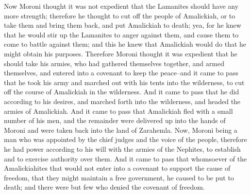 Now Moroni thought it was not expedient that the Lamanites should have any more strength; therefore he thought to cut off the people of Amalickiah, or to take them and bring them back, and put Amalickiah to death; yea, for he knew that he would stir up the Lamanites to anger against them, and cause them to come to battle against them; and this he knew that Amalickiah would do that he might obtain his purposes.
\bverse \iffalse Therefore Moroni thought it was expedient that he should take his armies, who had gathered themselves together, and armed themselves, and entered into a covenant to keep the peace--and it came to pass that he took his army and marched out with his tents into the wilderness, to cut off the course of Amalickiah in the wilderness. \fi
Therefore Moroni thought it was expedient that he should take his armies, who had gathered themselves together, and armed themselves, and entered into a covenant to keep the peace--and it came to pass that he took his army and marched out with his tents into the wilderness, to cut off the course of Amalickiah in the wilderness.
\bverse \iffalse And it came to pass that he did according to his desires, and marched forth into the wilderness, and headed the armies of Amalickiah. \fi
And it came to pass that he did according to his desires, and marched forth into the wilderness, and headed the armies of Amalickiah.
\bverse \iffalse And it came to pass that Amalickiah fled with a small number of his men, and the remainder were delivered up into the hands of Moroni and were taken back into the land of Zarahemla. \fi
And it came to pass that Amalickiah fled with a small number of his men, and the remainder were delivered up into the hands of Moroni and were taken back into the land of Zarahemla.
\bverse \iffalse Now, Moroni being a man who was appointed by the chief judges and the voice of the people, therefore he had power according to his will with the armies of the Nephites, to establish and to exercise authority over them. \fi
Now, Moroni being a man who was appointed by the chief judges and the voice of the people, therefore he had power according to his will with the armies of the Nephites, to establish and to exercise authority over them.
\bverse \iffalse And it came to pass that whomsoever of the Amalickiahites that would not enter into a covenant to support the cause of freedom, that they might maintain a free government, he caused to be put to death; and there were but few who denied the covenant of freedom. \fi
And it came to pass that whomsoever of the Amalickiahites that would not enter into a covenant to support the cause of freedom, that they might maintain a free government, he caused to be put to death; and there were but few who denied the covenant of freedom.
